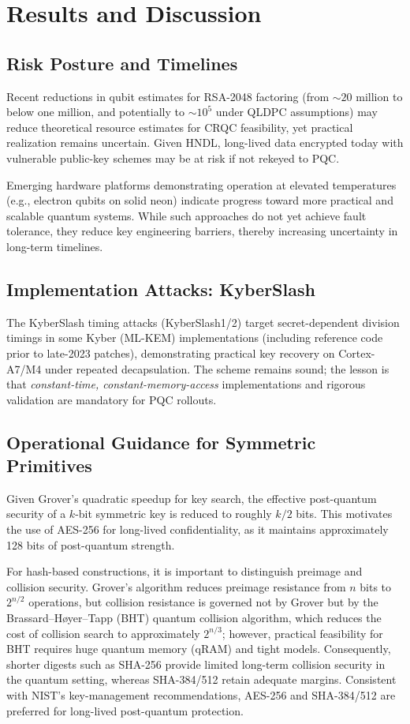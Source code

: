 \documentclass[11pt,a4paper]{article}
\begin{document}
\section{Results and Discussion}
\subsection{Risk Posture and Timelines}
Recent reductions in qubit estimates for RSA-2048 factoring (from \(\sim\!20\) million to below one million, and potentially to \(\sim\!10^5\) under QLDPC assumptions) may reduce theoretical resource estimates for CRQC feasibility, yet practical realization remains uncertain.\cite{gidney2025,webster2026} Given HNDL, long-lived data encrypted today with vulnerable public-key schemes may be at risk if not rekeyed to PQC.

Emerging hardware platforms demonstrating operation at elevated temperatures (e.g., electron qubits on solid neon) indicate progress toward more practical and scalable quantum systems. While such approaches do not yet achieve fault tolerance, they reduce key engineering barriers, thereby increasing uncertainty in long-term timelines.
\subsection{Implementation Attacks: KyberSlash}
The KyberSlash timing attacks (KyberSlash1/2) target secret-dependent division timings in some Kyber (ML-KEM) implementations (including reference code prior to late-2023 patches), demonstrating practical key recovery on Cortex-A7/M4 under repeated decapsulation. The scheme remains sound; the lesson is that \emph{constant-time, constant-memory-access} implementations and rigorous validation are mandatory for PQC rollouts.\cite{kyberslash}

\subsection{Operational Guidance for Symmetric Primitives}
Given Grover’s quadratic speedup for key search, the effective post-quantum security of a $k$-bit symmetric key is reduced to roughly $k/2$ bits. This motivates the use of AES-256 for long-lived confidentiality, as it maintains approximately 128 bits of post-quantum strength. 

For hash-based constructions, it is important to distinguish preimage and collision security. Grover’s algorithm reduces preimage resistance from $n$ bits to $2^{n/2}$ operations, but collision resistance is governed not by Grover but by the Brassard–Høyer–Tapp (BHT) quantum collision algorithm, which reduces the cost of collision search to approximately $2^{n/3}$; however, practical feasibility for BHT requires huge quantum memory (qRAM) and tight models. Consequently, shorter digests such as SHA-256 provide limited long-term collision security in the quantum setting, whereas SHA-384/512 retain adequate margins. Consistent with NIST’s key-management recommendations, AES-256 and SHA-384/512 are preferred for long-lived post-quantum protection.\cite{bht1997}
\end{document}
